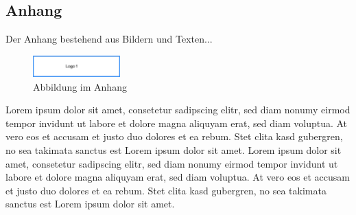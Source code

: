 \subsection*{Anhang}\label{anhang}

Der Anhang bestehend aus Bildern und Texten...

\begin{figure}[htb]
 \centering
 \includegraphics[width=0.3\textwidth,angle=0]{img/logo1}
 \caption[Abbildung im Anhang]{Abbildung im Anhang}
\label{fig:Abbildung im Anhang}
\end{figure}

Lorem ipsum dolor sit amet, consetetur sadipscing elitr, sed diam nonumy eirmod tempor invidunt ut labore et dolore magna aliquyam erat, sed diam voluptua. At vero eos et accusam et justo duo dolores et ea rebum. Stet clita kasd gubergren, no sea takimata sanctus est Lorem ipsum dolor sit amet. Lorem ipsum dolor sit amet, consetetur sadipscing elitr, sed diam nonumy eirmod tempor invidunt ut labore et dolore magna aliquyam erat, sed diam voluptua. At vero eos et accusam et justo duo dolores et ea rebum. Stet clita kasd gubergren, no sea takimata sanctus est Lorem ipsum dolor sit amet.
